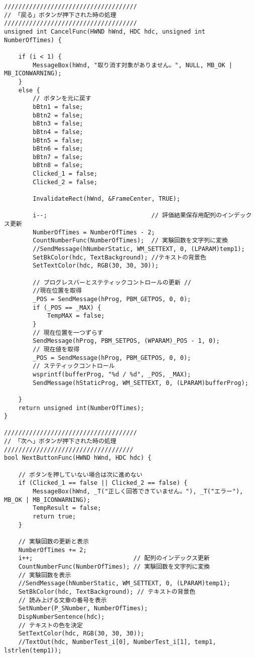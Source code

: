 \begin{lstlisting}[caption=main.cpp]
/////////////////////////////////////
// 「戻る」ボタンが押下された時の処理
/////////////////////////////////////
unsigned int CancelFunc(HWND hWnd, HDC hdc, unsigned int NumberOfTimes) {

	if (i < 1) {
		MessageBox(hWnd, "取り消す対象がありません。", NULL, MB_OK | MB_ICONWARNING);
	}
	else {
		// ボタンを元に戻す
		bBtn1 = false;
		bBtn2 = false;
		bBtn3 = false;
		bBtn4 = false;
		bBtn5 = false;
		bBtn6 = false;
		bBtn7 = false;
		bBtn8 = false;
		Clicked_1 = false;
		Clicked_2 = false;

		InvalidateRect(hWnd, &FrameCenter, TRUE);

		i--;                             // 評価結果保存用配列のインデックス更新
		NumberOfTimes = NumberOfTimes - 2;
		CountNumberFunc(NumberOfTimes);  // 実験回数を文字列に変換
		//SendMessage(hNumberStatic, WM_SETTEXT, 0, (LPARAM)temp1);
		SetBkColor(hdc, TextBackground); //テキストの背景色
		SetTextColor(hdc, RGB(30, 30, 30));

		// プログレスバーとステティックコントロールの更新 //
		//現在位置を取得
		_POS = SendMessage(hProg, PBM_GETPOS, 0, 0); 
		if (_POS == _MAX) {
			TempMAX = false;
		}
		// 現在位置を一つずらす
		SendMessage(hProg, PBM_SETPOS, (WPARAM)_POS - 1, 0);
		// 現在値を取得
		_POS = SendMessage(hProg, PBM_GETPOS, 0, 0);
		// ステティックコントロール
		wsprintf(bufferProg, "%d / %d", _POS, _MAX);
		SendMessage(hStaticProg, WM_SETTEXT, 0, (LPARAM)bufferProg);

	}
	return unsigned int(NumberOfTimes);
}

/////////////////////////////////////
// 「次へ」ボタンが押下された時の処理
////////////////////////////////////
bool NextButtonFunc(HWND hWnd, HDC hdc) {

	// ボタンを押していない場合は次に進めない
	if (Clicked_1 == false || Clicked_2 == false) {
		MessageBox(hWnd, _T("正しく回答できていません。"), _T("エラー"), MB_OK | MB_ICONWARNING);
		TempResult = false;
		return true;
	}

	// 実験回数の更新と表示
	NumberOfTimes += 2;
	i++;                            // 配列のインデックス更新
	CountNumberFunc(NumberOfTimes); // 実験回数を文字列に変換
	// 実験回数を表示
	//SendMessage(hNumberStatic, WM_SETTEXT, 0, (LPARAM)temp1);
	SetBkColor(hdc, TextBackground); // テキストの背景色
	// 読み上げる文章の番号を表示
	SetNumber(P_SNumber, NumberOfTimes);
	DispNumberSentence(hdc);
	// テキストの色を決定
	SetTextColor(hdc, RGB(30, 30, 30));
	//TextOut(hdc, NumberTest_i[0], NumberTest_i[1], temp1, lstrlen(temp1));
	

\end{lstlisting}
